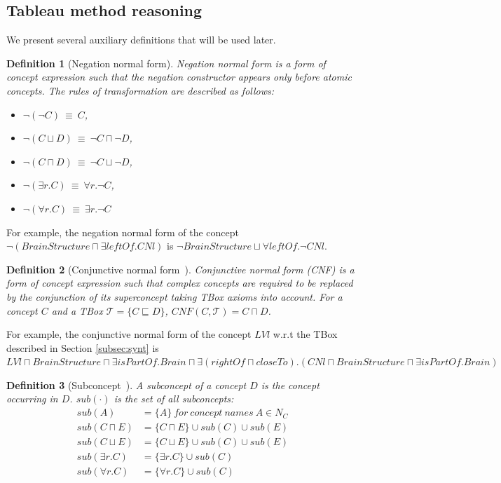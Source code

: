 \documentclass{article}
\newtheorem{mydef}{Definition}
\begin{document}
\subsection{Tableau method reasoning}\label{sec:reasoning}
We present several auxiliary definitions that will be used later.
\begin{mydef}[Negation normal form]
Negation normal form is a form of concept expression such that the negation constructor appears only before atomic concepts.
The rules of transformation are described as follows:
\begin{itemize}
\item  $\neg(\neg C) ~\equiv~ C$,
\item $\neg(C\sqcup D) ~\equiv~ \neg C \sqcap \neg D$,
\item $\neg(C\sqcap D) ~\equiv~ \neg C \sqcup \neg D$,
\item $\neg(\exists r.C) ~\equiv~ \forall r.\neg C$,
\item $\neg(\forall r.C) ~\equiv~  \exists r.\neg C$
\end{itemize}
\end{mydef}
For example, the negation normal form of the concept $\neg (BrainStructure\sqcap \exists leftOf.CNl)$ is $\neg BrainStructure \sqcup \forall leftOf.\neg CNl$.

\begin{mydef}[Conjunctive normal form~\cite{di2007semantic}]
Conjunctive normal form (CNF) is a form of concept expression such that complex concepts are required to be replaced by the conjunction
of its superconcept taking TBox axioms into account.
For a concept $C$ and a TBox $\mathcal{T}=\{C\sqsubseteq D\}$, $CNF(C,\mathcal{T})=C\sqcap D$.
\end{mydef}
For example, the conjunctive normal form of the concept $LVl$ w.r.t the TBox described in Section \ref{subsec:synt} is
$LVl \sqcap BrainStructure \sqcap \exists isPartOf. Brain \sqcap \exists (rightOf \sqcap closeTo). (CNl \sqcap BrainStructure \sqcap \exists isPartOf. Brain)$

\begin{mydef}[Subconcept~\cite{horrocks1999description}]
 A subconcept of a concept $D$ is the concept occurring in $D$. $sub(\cdot)$ is the set of all subconcepts:
 \begin{align*}
 sub(A)&=\{A\}~for~concept~names~A\in N_C\\
 sub(C\sqcap E)&=\{C\sqcap E\}\cup sub(C)\cup sub(E)\\
 sub(C\sqcup E)&=\{C\sqcup E\}\cup sub(C)\cup sub(E)\\
 sub(\exists r.C)&=\{\exists r.C\}\cup sub(C)\\
 sub(\forall r.C)&=\{\forall r.C\}\cup sub(C)
 \end{align*}
\end{mydef}
\end{document}
